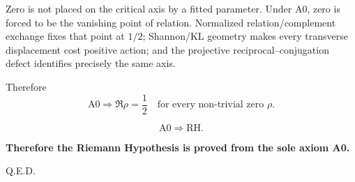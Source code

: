 Zero is not placed on the critical axis by a fitted parameter.  Under A0,
zero is forced to be the vanishing point of relation.  Normalized
relation/complement exchange fixes that point at \(1/2\); Shannon/KL geometry
makes every transverse displacement cost positive action; and the projective
reciprocal--conjugation defect identifies precisely the same axis.

Therefore
\[
\boxed{
\mathrm{A0}
\Longrightarrow
\Re\rho=\frac12
\quad
\text{for every non-trivial zero }\rho.
}
\]

\[
\boxed{\mathrm{A0}\Longrightarrow\mathrm{RH}.}
\]

\noindent\textbf{Therefore the Riemann Hypothesis is proved from the sole axiom A0.}\par
\medskip
\hfill Q.E.D.


